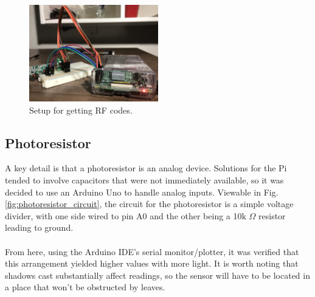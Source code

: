 \documentclass[]{article}
\begin{document}
\begin{figure}[h]
	\centering
	\includegraphics[width=0.5\textwidth]{rf_circuit}
	\caption{Setup for getting RF codes.}
	\label{fig:rf_circuit}
\end{figure}

\subsection{Photoresistor}
A key detail is that a photoresistor is an analog device.  Solutions for the Pi tended to involve capacitors that were not immediately available, so it was decided to use an Arduino Uno to handle analog inputs.  Viewable in Fig. \ref{fig:photoresistor_circuit}, the circuit for the photoresistor is a simple voltage divider, with one side wired to pin A0 and the other being a 10k $\Omega$ resistor leading to ground.  
\\\\
From here, using the Arduino IDE's serial monitor/plotter, it was verified that this arrangement yielded higher values with more light.  It is worth noting that shadows cast substantially affect readings, so the sensor will have to be located in a place that won't be obstructed by leaves.
\end{document}
